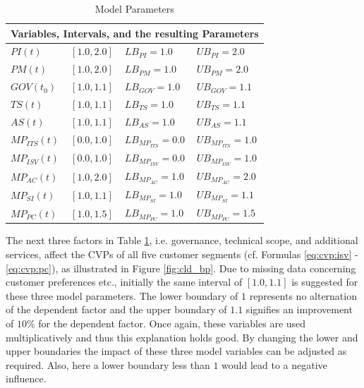 \begin{table}[t]
	\centering
	\begin{tabular}{llll}
			\toprule 
			\multicolumn{4}{c}{\footnotesize \textbf{Variables, Intervals, and the resulting Parameters}}\\ \midrule
			\footnotesize $PI(t)$ & \footnotesize $[1.0,2.0]$ & \footnotesize $LB_{PI} = 1.0$ & \footnotesize $UB_{PI} = 2.0$ \\ 
			\footnotesize $PM(t)$ & \footnotesize  $[1.0,2.0]$ & \footnotesize $LB_{PM} = 1.0$ & \footnotesize $UB_{PM} = 2.0$ \\ \midrule
			\footnotesize $GOV(t_0)$ & \footnotesize $[1.0,1.1]$ & \footnotesize $LB_{GOV} = 1.0$ & \footnotesize $UB_{GOV} = 1.1$ \\
			\footnotesize $TS(t)$ & \footnotesize $[1.0,1.1]$ & \footnotesize $LB_{TS} = 1.0$ & \footnotesize $UB_{TS} = 1.1$ \\
			\footnotesize $AS(t)$ & \footnotesize $[1.0,1.1]$ & \footnotesize $LB_{AS} = 1.0$ & \footnotesize $UB_{AS} = 1.1$ \\ \midrule
			\footnotesize $MP_{ITS}(t)$ & \footnotesize $[0.0,1.0]$ & \footnotesize $LB_{MP_{ITS}} = 0.0$ & \footnotesize $UB_{MP_{ITS}} = 1.0$ \\
			\footnotesize $MP_{ISV}(t)$ & \footnotesize $[0.0,1.0]$ & \footnotesize $LB_{MP_{ISV}} = 0.0$ & \footnotesize $UB_{MP_{ISV}} = 1.0$ \\
			\footnotesize $MP_{AC}(t)$ & \footnotesize $[1.0,2.0]$ & \footnotesize $LB_{MP_{AC}} = 1.0$ & \footnotesize $UB_{MP_{AC}} = 2.0$ \\
			\footnotesize $MP_{SI}(t)$ & \footnotesize $[1.0,1.1]$ & \footnotesize $LB_{MP_{SI}} = 1.0$ & \footnotesize $UB_{MP_{SI}} = 1.1$ \\
			\footnotesize $MP_{PC}(t)$ & \footnotesize $[1.0,1.5]$ & \footnotesize $LB_{MP_{PC}} = 1.0$ & \footnotesize $UB_{MP_{PC}} = 1.5$ \\ \bottomrule
	\end{tabular}
	\caption{Model Parameters}
	\label{tab:mpara}
\end{table}

The next three factors in Table \ref{tab:mpara}, i.e. governance, technical scope, and additional services, affect the \acp{CVP} of all five customer segments (cf. Formulas \ref{eq:cvp:isv} - \ref{eq:cvp:pc}), as illustrated in Figure \ref{fig:cld_bp}. Due to missing data concerning customer preferences etc., initially the same interval of $[1.0,1.1]$ is suggested for these three model parameters. The lower boundary of $1$ represents no alternation of the dependent factor and the upper boundary of $1.1$ signifies an improvement of $10\%$ for the dependent factor. Once again, these variables are used multiplicatively and thus this explanation holds good. By changing the lower and upper boundaries the impact of these three model variables can be adjusted as required. Also, here a lower boundary less than $1$ would lead to a negative influence.

